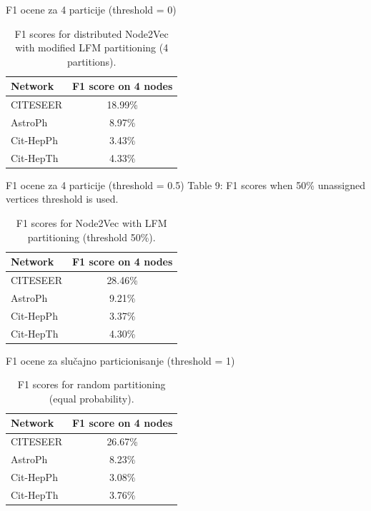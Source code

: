 \documentclass{beamer}
\begin{document}
\begin{frame}{F1 ocene za 4 particije (threshold = 0)}
\begin{table}[h]
\centering
\begin{tabular}{lc}
\hline
\textbf{Network} & \textbf{F1 score on 4 nodes} \\
\hline
CITESEER   & 18.99\% \\
AstroPh    & 8.97\%  \\
Cit-HepPh  & 3.43\%  \\
Cit-HepTh  & 4.33\%  \\
\hline
\end{tabular}
\caption*{F1 scores for distributed Node2Vec with modified LFM partitioning (4 partitions).}
\end{table}
\end{frame}

\begin{frame}{F1 ocene za 4 particije (threshold = 0.5)}
Table 9: F1 scores when 50\% unassigned vertices threshold is used.
\begin{table}[h]
\centering
\begin{tabular}{lc}
\hline
\textbf{Network} & \textbf{F1 score on 4 nodes} \\
\hline
CITESEER   & 28.46\% \\
AstroPh    & 9.21\%  \\
Cit-HepPh  & 3.37\%  \\
Cit-HepTh  & 4.30\%  \\
\hline
\end{tabular}
\caption*{F1 scores for Node2Vec with LFM partitioning (threshold 50\%).}
\end{table}
\end{frame}

\begin{frame}{F1 ocene za slučajno particionisanje (threshold = 1)}
\begin{table}[h]
\centering
\begin{tabular}{lc}
\hline
\textbf{Network} & \textbf{F1 score on 4 nodes} \\
\hline
CITESEER   & 26.67\% \\
AstroPh    & 8.23\%  \\
Cit-HepPh  & 3.08\%  \\
Cit-HepTh  & 3.76\%  \\
\hline
\end{tabular}
\caption*{F1 scores for random partitioning (equal probability).}
\end{table}
\end{frame}
\end{document}
